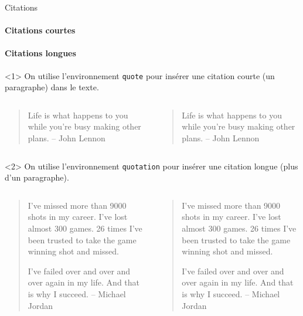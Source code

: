 \begin{frame}[fragile,c]{Citations}
	\framesubtitle<1>{Citations courtes}
	\framesubtitle<2>{Citations longues}
	\begin{onlyenv}
		On utilise l'environnement \texttt{quote} pour insérer une citation courte (un paragraphe)
		dans le texte.
	
		\begin{columns}
			\begin{column}{.49\textwidth}
				\vspace{-17mm}
\begin{codesource}
	\begin{quote}
		Life is what happens to you while 
		you're busy making other plans. 
		-- John Lennon
	\end{quote}
\end{codesource}
			\end{column}
		
			\begin{column}{.49\textwidth}
				\begin{quote}
					Life is what happens to you while you're busy making other plans. -- John Lennon
				\end{quote}
			\end{column}
		\end{columns}
	\end{onlyenv}

	\begin{onlyenv}
		On utilise l'environnement \texttt{quotation} pour insérer une citation longue (plus
		d'un paragraphe).
		
		\begin{columns}
			\begin{column}{.49\textwidth}
				\vspace{-38mm}
\begin{codesource}
	\begin{quotation}
		I've missed more than 9000 shots in my 
		career. I've lost almost 300 games. 26 
		times I've been trusted to take the game 
		winning shot and missed.
		
		I've failed over and over and over again 
		in my life. And that is why I succeed. 
		-- Michael Jordan
	\end{quotation}
\end{codesource}	
			\end{column}
		
			\begin{column}{.49\textwidth}
\begin{quotation}
	I've missed more than 9000 shots in my career. 
	I've lost almost 300 games. 26 times I've been 
	trusted to take the game winning shot and missed.
	
	I've failed over and over and over again in my life. 
	And that is why I succeed. -- Michael Jordan
\end{quotation}
			\end{column}
		\end{columns}
	\end{onlyenv}
\end{frame}

